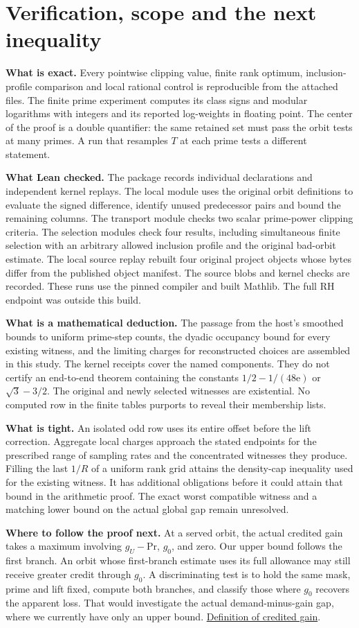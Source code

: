 \documentclass[12pt,letterpaper]{article}
\newcommand{\orig}[3]{\href{https://github.com/nousentllc/riemann-hypothesis/blob/40e56bab026552e089d7afcfeff08d2defb9c005/src/#1.lean\#L#2}{#3}}
\newcommand{\para}[1]{\par\medskip\noindent\textbf{#1}\quad}
\newcommand{\pagepart}[1]{\clearpage\section{#1}}
\begin{document}
\pagepart{Verification, scope and the next inequality}
\para{What is exact.} Every pointwise clipping value, finite rank optimum, inclusion-profile comparison and local rational control is reproducible from the attached files. The finite prime experiment computes its class signs and modular logarithms with integers and its reported log-weights in floating point. The center of the proof is a double quantifier: the same retained set must pass the orbit tests at many primes. A run that resamples \(T\) at each prime tests a different statement.

\para{What Lean checked.} The package records individual declarations and independent kernel replays. The local module uses the original orbit definitions to evaluate the signed difference, identify unused predecessor pairs and bound the remaining columns. The transport module checks two scalar prime-power clipping criteria. The selection modules check four results, including simultaneous finite selection with an arbitrary allowed inclusion profile and the original bad-orbit estimate. The local source replay rebuilt four original project objects whose bytes differ from the published object manifest. The source blobs and kernel checks are recorded. These runs use the pinned compiler and built Mathlib. The full RH endpoint was outside this build.

\para{What is a mathematical deduction.} The passage from the host's smoothed bounds to uniform prime-step counts, the dyadic occupancy bound for every existing witness, and the limiting charges for reconstructed choices are assembled in this study. The kernel receipts cover the named components. They do not certify an end-to-end theorem containing the constants \(1/2-1/(48\mathrm e)\) or \(\sqrt3-3/2\). The original and newly selected witnesses are existential. No computed row in the finite tables purports to reveal their membership lists.

\para{What is tight.} An isolated odd row uses its entire offset before the lift correction. Aggregate local charges approach the stated endpoints for the prescribed range of sampling rates and the concentrated witnesses they produce. Filling the last \(1/R\) of a uniform rank grid attains the density-cap inequality used for the existing witness. It has additional obligations before it could attain that bound in the arithmetic proof. The exact worst compatible witness and a matching lower bound on the actual global gap remain unresolved.

\para{Where to follow the proof next.} At a served orbit, the actual credited gain takes a maximum involving \(g_U-\mathrm{Pr}\), \(g_0\), and zero. Our upper bound follows the first branch. An orbit whose first-branch estimate uses its full allowance may still receive greater credit through \(g_0\). A discriminating test is to hold the same mask, prime and lift fixed, compute both branches, and classify those where \(g_0\) recovers the apparent loss. That would investigate the actual demand-minus-gain gap, where we currently have only an upper bound. \orig{Formalism/LocalToGlobal/GlobalTheory/IsResidueClassZero}{224}{Definition of credited gain}.
\end{document}

